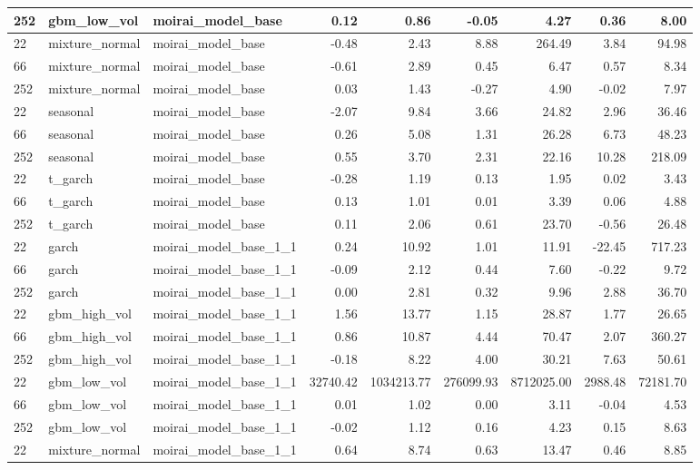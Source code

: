 {\begin{tabular}{lllrrrrrr}
252 & gbm\_low\_vol & moirai\_model\_base & 0.12 & 0.86 & -0.05 & 4.27 & 0.36 & 8.00 \\
\midrule
22 & mixture\_normal & moirai\_model\_base & -0.48 & 2.43 & 8.88 & 264.49 & 3.84 & 94.98 \\
66 & mixture\_normal & moirai\_model\_base & -0.61 & 2.89 & 0.45 & 6.47 & 0.57 & 8.34 \\
252 & mixture\_normal & moirai\_model\_base & 0.03 & 1.43 & -0.27 & 4.90 & -0.02 & 7.97 \\
\midrule
22 & seasonal & moirai\_model\_base & -2.07 & 9.84 & 3.66 & 24.82 & 2.96 & 36.46 \\
66 & seasonal & moirai\_model\_base & 0.26 & 5.08 & 1.31 & 26.28 & 6.73 & 48.23 \\
252 & seasonal & moirai\_model\_base & 0.55 & 3.70 & 2.31 & 22.16 & 10.28 & 218.09 \\
\midrule
22 & t\_garch & moirai\_model\_base & -0.28 & 1.19 & 0.13 & 1.95 & 0.02 & 3.43 \\
66 & t\_garch & moirai\_model\_base & 0.13 & 1.01 & 0.01 & 3.39 & 0.06 & 4.88 \\
252 & t\_garch & moirai\_model\_base & 0.11 & 2.06 & 0.61 & 23.70 & -0.56 & 26.48 \\
\midrule
22 & garch & moirai\_model\_base\_1\_1 & 0.24 & 10.92 & 1.01 & 11.91 & -22.45 & 717.23 \\
66 & garch & moirai\_model\_base\_1\_1 & -0.09 & 2.12 & 0.44 & 7.60 & -0.22 & 9.72 \\
252 & garch & moirai\_model\_base\_1\_1 & 0.00 & 2.81 & 0.32 & 9.96 & 2.88 & 36.70 \\
\midrule
22 & gbm\_high\_vol & moirai\_model\_base\_1\_1 & 1.56 & 13.77 & 1.15 & 28.87 & 1.77 & 26.65 \\
66 & gbm\_high\_vol & moirai\_model\_base\_1\_1 & 0.86 & 10.87 & 4.44 & 70.47 & 2.07 & 360.27 \\
252 & gbm\_high\_vol & moirai\_model\_base\_1\_1 & -0.18 & 8.22 & 4.00 & 30.21 & 7.63 & 50.61 \\
\midrule
22 & gbm\_low\_vol & moirai\_model\_base\_1\_1 & 32740.42 & 1034213.77 & 276099.93 & 8712025.00 & 2988.48 & 72181.70 \\
66 & gbm\_low\_vol & moirai\_model\_base\_1\_1 & 0.01 & 1.02 & 0.00 & 3.11 & -0.04 & 4.53 \\
252 & gbm\_low\_vol & moirai\_model\_base\_1\_1 & -0.02 & 1.12 & 0.16 & 4.23 & 0.15 & 8.63 \\
\midrule
22 & mixture\_normal & moirai\_model\_base\_1\_1 & 0.64 & 8.74 & 0.63 & 13.47 & 0.46 & 8.85 \\

\end{tabular}}
